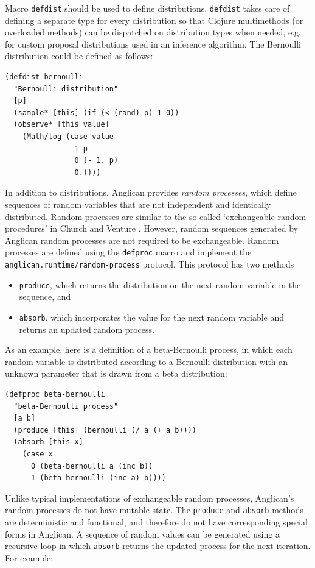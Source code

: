 \documentclass[preprint]{sigplanconf}
\begin{document}
Macro \texttt{defdist} should be used to define distributions.
\texttt{defdist} takes care of defining a separate type
for every distribution so that Clojure multimethods (or overloaded
methods) can be dispatched on
distribution types when needed, e.g. for custom proposal distributions 
used in an inference algorithm. The
Bernoulli distribution could be defined as follows:
\begin{lstlisting}[style=default]
(defdist bernoulli
  "Bernoulli distribution"
  [p]
  (sample* [this] (if (< (rand) p) 1 0))
  (observe* [this value]
    (Math/log (case value
                1 p
                0 (- 1. p)
                0.))))
\end{lstlisting}

In addition to distributions, Anglican provides \textit{random processes},
which define sequences of random variables that are not independent and
identically distributed. Random processes are similar to the so called
`exchangeable random procedures' in Church \cite{GMR+08} and
Venture \cite{MSP14}. However, random sequences generated by Anglican random 
processes are not required to be exchangeable. Random processes are
defined using the \texttt{defproc} macro and implement the
\texttt{anglican.runtime/{\linebreak[0]}random-process} protocol. This
protocol has two methods
\begin{itemize}
\item \texttt{produce}, which returns the distribution on the next
random variable in the sequence, and
\item \texttt{absorb}, which incorporates the value for the next random
variable and returns an updated random process.
\end{itemize}
 As an example, here is a definition of a beta-Bernoulli process, in which
each random variable is distributed according to a Bernoulli distribution with
an unknown parameter that is drawn from a beta distribution:
\begin{lstlisting}[style=default]
(defproc beta-bernoulli
  "beta-Bernoulli process"
  [a b]
  (produce [this] (bernoulli (/ a (+ a b))))
  (absorb [this x]
    (case x
      0 (beta-bernoulli a (inc b))
      1 (beta-bernoulli (inc a) b))))
\end{lstlisting}
Unlike typical implementations of exchangeable random processes, Anglican's random processes do not have mutable state. The \texttt{produce} and \texttt{absorb} methods are deterministic and functional, and therefore do not have corresponding special forms in Anglican. A sequence of random values can be generated using a recursive loop in which \texttt{absorb} returns the updated process for the next iteration. For example:
\end{document}
